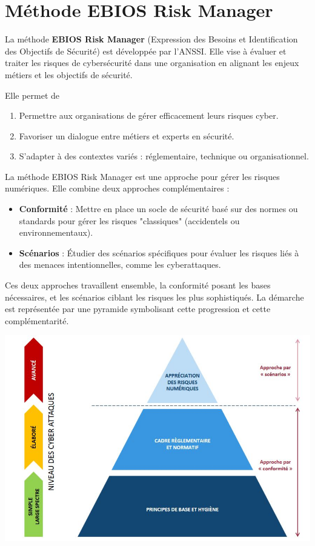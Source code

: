 \documentclass[french, 12pt]{article}%
\newcommand{\itemE}{\item[$\bullet$]}
\begin{document}
\section{Méthode EBIOS Risk Manager}

La méthode \textbf{EBIOS Risk Manager} (Expression des Besoins et Identification des Objectifs de Sécurité) est développée par l'ANSSI. Elle vise à évaluer et traiter les risques de cybersécurité dans une organisation en alignant les enjeux métiers et les objectifs de sécurité.

Elle permet de 
\begin{enumerate}
    \itemE Permettre aux organisations de gérer efficacement leurs risques cyber.
    \itemE Favoriser un dialogue entre métiers et experts en sécurité.
    \itemE S'adapter à des contextes variés : réglementaire, technique ou organisationnel.
\end{enumerate}

\vspace{0.5cm}
La méthode EBIOS Risk Manager est une approche pour gérer les risques numériques. Elle combine deux approches complémentaires :
\begin{itemize}
\itemE \textbf{Conformité} : Mettre en place un socle de sécurité basé sur des normes ou standards pour gérer les risques "classiques" (accidentels ou environnementaux).
\itemE \textbf{Scénarios} : Étudier des scénarios spécifiques pour évaluer les risques liés à des menaces intentionnelles, comme les cyberattaques.
\end{itemize}

Ces deux approches travaillent ensemble, la conformité posant les bases nécessaires, et les scénarios ciblant les risques les plus sophistiqués. La démarche est représentée par une pyramide symbolisant cette progression et cette complémentarité.

\begin{center}
\includegraphics[scale=0.4]{./ressource/la pyramide.JPG}
\end{center}
\end{document}
